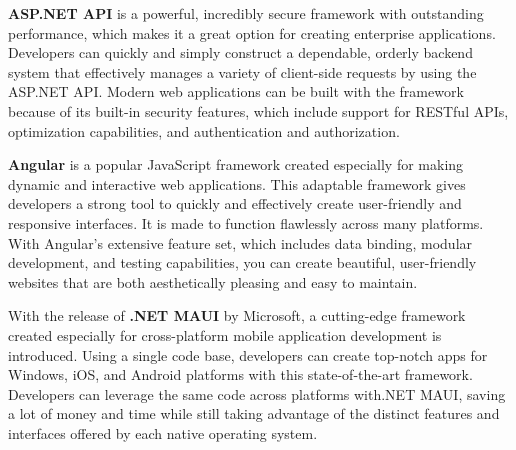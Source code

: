 \textbf{ASP.NET API} is a powerful, incredibly secure framework with outstanding performance, which makes it a great option for creating enterprise applications. Developers can quickly and simply construct a dependable, orderly backend system that effectively manages a variety of client-side requests by using the ASP.NET API. Modern web applications can be built with the framework because of its built-in security features, which include support for RESTful APIs, optimization capabilities, and authentication and authorization. \cite{aspnet}

\textbf{Angular} is a popular JavaScript framework created especially for making dynamic and interactive web applications. This adaptable framework gives developers a strong tool to quickly and effectively create user-friendly and responsive interfaces. It is made to function flawlessly across many platforms. With Angular's extensive feature set, which includes data binding, modular development, and testing capabilities, you can create beautiful, user-friendly websites that are both aesthetically pleasing and easy to maintain. \cite{angular}

With the release of \textbf{.NET MAUI} by Microsoft, a cutting-edge framework created especially for cross-platform mobile application development is introduced. Using a single code base, developers can create top-notch apps for Windows, iOS, and Android platforms with this state-of-the-art framework. Developers can leverage the same code across platforms with.NET MAUI, saving a lot of money and time while still taking advantage of the distinct features and interfaces offered by each native operating system. \cite{maui}



